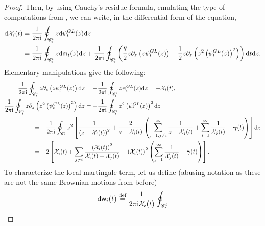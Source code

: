 \documentclass[]{article}
\begin{document}
\begin{proof}
Then, by using Cauchy's residue formula, emulating the type of computations from \cite{HuangZhang}, we can write, in the differential form of the equation, 
\begin{align*}
 \mathrm{d}\mathcal{X}_i(t)&=
 \frac{1}{2\pi\textnormal{i}}
 \oint_{\mathscr{C}_t^i} 
    z\mathrm{d}\psi^{GL}_t(z)\mathrm{d}z
    \\&=
    \frac{1}{2\pi\textnormal{i}}\oint_{\mathscr{C}_t^i}
    z\mathrm{d}\mathsf{m}_t(z)\mathrm{d}z
    +
    \frac{1}{2\pi\textnormal{i}}
    \oint_{\mathscr{C}_t^i}\left(
    \frac{\theta}{2}z\partial_z\left(z\psi^{GL}_t(z)\right)
    -
   \frac{1}{2}
    z\partial_z
    \left(z^2\left(\psi^{GL}_t(z)\right)^2\right)\right)
    \mathrm{d}t\mathrm{d}z.
\end{align*}
Elementary manipulations give the following:
\begin{align*}
\frac{1}{2\pi\textnormal{i}}
    \oint_{\mathscr{C}_t^i}
z\partial_z\left(z\psi^{GL}_t(z)\right)\mathrm{d}z&
=
-\frac{1}{2\pi\textnormal{i}}
    \oint_{\mathscr{C}_t^i}
z\psi^{GL}_t(z)\mathrm{d}z
=
-\mathcal{X}_i(t),
   \\
   \frac{1}{2\pi\textnormal{i}}\oint_{\mathscr{C}_t^i} 
    z\partial_z
\left(z^2\left(\psi^{GL}_t(z)\right)^2\right)\mathrm{d}z
    &=
    -\frac{1}{2\pi\textnormal{i}}\oint_{\mathscr{C}_t^i} 
    z^2\left(\psi^{GL}_t(z)\right)^2
    \mathrm{d}z
    \\
    &\hspace{-3cm}=
    -\frac{1}{2\pi\textnormal{i}}\oint_{\mathscr{C}_t^i} 
    z^2\left[
    \frac{1}{\left(z-\mathcal{X}_i(t)\right)^2}
    +
   \frac{2}{z-\mathcal{X}_i(t)}
    \left(
    \sum_{j=1,j\neq i}^\infty
\frac{1}{z-\mathcal{X}_j(t)}
+ 
\sum_{j=1}^\infty
\frac{1}{\mathcal{X}_j(t)}
-
\boldsymbol{\gamma}(t)
    \right)
    \right]\mathrm{d}z
    \\
    &\hspace{-3cm}=
    -2\left[\mathcal{X}_i(t)
    +
    \sum_{j\neq i}\frac{\left(\mathcal{X}_i(t)\right)^2}{\mathcal{X}_i(t)-\mathcal{X}_j(t)}
    +\left(\mathcal{X}_i(t)\right)^2\left(\sum_{j=1}^\infty\frac{1}{\mathcal{X}_j(t)}
    -
    \boldsymbol{\gamma}(t)\right)\right].
\end{align*}
To characterize the local martingale term, let us define (abusing notation as these are not the same Brownian motions from before)
\begin{align}\label{tilde-w def-IL}
   \mathrm{d} \mathsf{w}_i(t)
    \overset{\textnormal{def}}{=}
    \frac{1}{2\pi\textnormal{i}\mathcal{X}_i(t)}\oint_{\mathscr{C}_t^i}

\end{align}
\end{proof}
\end{document}
